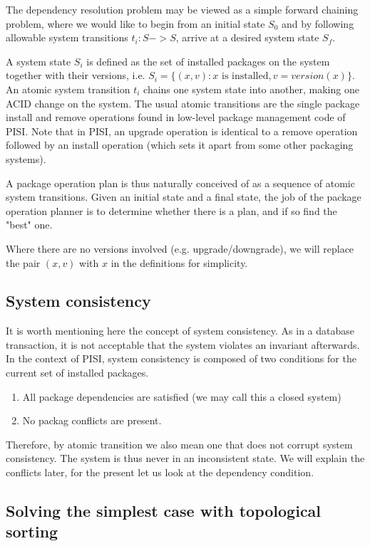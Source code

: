 \documentclass[a4paper,11pt]{article}
\begin{document}
The dependency resolution problem may be viewed as a simple forward
chaining problem, where we would like to begin from an initial state
$S_0$ and by following allowable system transitions $t_i: S -> S$, 
arrive at a desired system state $S_f$.

A system state $S_i$ is defined as the set of installed packages on the
system together with their versions, i.e. $S_i = \{  (x,v) : x \text{ is
installed}, v=version(x)\} $. An atomic system transition $t_i$ chains one
system state into another, making one ACID change on the system. The
usual atomic transitions are the single package install and remove 
operations found in low-level package management code of PISI. Note
that in PISI, an upgrade operation is identical to a remove operation
followed by an install operation (which sets it apart from some other
packaging systems).

A package operation plan is thus naturally conceived of as a sequence
of atomic system transitions. Given an initial state and a final
state, the job of the package operation planner is to determine
whether there is a plan, and if so find the "best" one.

Where there are no versions involved (e.g. upgrade/downgrade), we will
replace the pair $(x,v)$ with $x$ in the definitions for simplicity.

\subsection{System consistency}

It is worth mentioning here the concept of system consistency. As in a
database transaction, it is not acceptable that the system violates an
invariant afterwards. In the context of PISI, system consistency is
composed of two conditions for the current set of installed packages.
\begin{enumerate}
\item All package dependencies are satisfied (we may call this a
  closed system)
\item No packag conflicts are present. 
\end{enumerate}

Therefore, by atomic transition we also mean one that does not corrupt
system consistency. The system is thus never in an inconsistent
state. We will explain the conflicts later, for the present let us
look at the dependency condition.

\subsection{Solving the simplest case with topological sorting}
\end{document}
